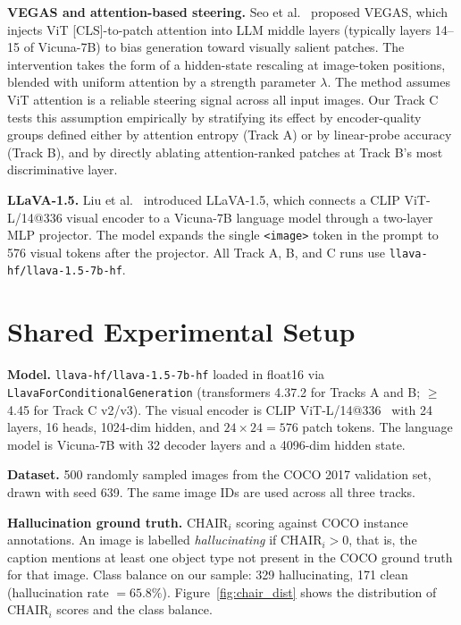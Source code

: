 \documentclass[11pt]{article}
\begin{document}
\textbf{VEGAS and attention-based steering.} Seo et al.~\cite{seo2024vegas} proposed
VEGAS, which injects ViT [CLS]-to-patch attention into LLM middle layers (typically
layers 14--15 of Vicuna-7B) to bias generation toward visually salient patches. The
intervention takes the form of a hidden-state rescaling at image-token positions,
blended with uniform attention by a strength parameter $\lambda$. The method assumes
ViT attention is a reliable steering signal across all input images. Our Track C tests
this assumption empirically by stratifying its effect by encoder-quality groups defined
either by attention entropy (Track A) or by linear-probe accuracy (Track B), and by
directly ablating attention-ranked patches at Track B's most discriminative layer.

\textbf{LLaVA-1.5.} Liu et al.~\cite{liu2023llava} introduced LLaVA-1.5, which
connects a CLIP ViT-L/14@336 visual encoder to a Vicuna-7B language model through a
two-layer MLP projector. The model expands the single \texttt{<image>} token in the
prompt to 576 visual tokens after the projector. All Track A, B, and C runs use
\texttt{llava-hf/llava-1.5-7b-hf}.

\section{Shared Experimental Setup}

\textbf{Model.} \texttt{llava-hf/llava-1.5-7b-hf} loaded in float16 via
\texttt{LlavaForConditionalGeneration} (transformers 4.37.2 for Tracks A and B;
$\geq$4.45 for Track C v2/v3). The visual encoder is CLIP
ViT-L/14@336~\cite{dosovitskiy2021vit} with 24 layers, 16 heads, 1024-dim hidden, and
$24 \times 24 = 576$ patch tokens. The language model is Vicuna-7B with 32 decoder
layers and a 4096-dim hidden state.

\textbf{Dataset.} 500 randomly sampled images from the COCO 2017 validation set, drawn
with seed 639. The same image IDs are used across all three tracks.

\textbf{Hallucination ground truth.} $\mathrm{CHAIR}_i$ scoring against COCO instance
annotations. An image is labelled \emph{hallucinating} if $\mathrm{CHAIR}_i > 0$,
that is, the caption mentions at least one object type not present in the COCO ground
truth for that image. Class balance on our sample: 329 hallucinating, 171 clean
(hallucination rate $= 65.8\%$). Figure~\ref{fig:chair_dist} shows the distribution of
$\mathrm{CHAIR}_i$ scores and the class balance.
\end{document}
